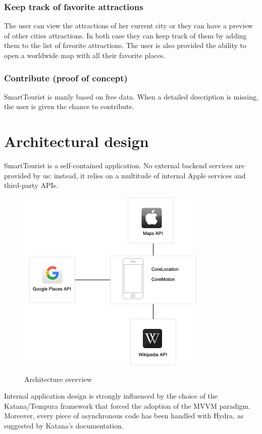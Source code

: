 \documentclass[a4paper, 11pt, parskip=half]{scrreprt}
\theoremstyle{definition}
\begin{document}
\subsection{Keep track of favorite attractions}
The user can view the attractions of her current city or they can have a preview of other cities attractions. In both case they can keep track of them by adding them to the list of favorite attractions. The user is also provided the ability to open a worldwide map with all their favorite places.

\subsection{Contribute (proof of concept)}
SmartTourist is manly based on free data. When a detailed description is missing, the user is given the chance to contribute.




\chapter{Architectural design}

SmartTourist is a self-contained application. No external backend services are provided by us: instead, it relies on a multitude of internal Apple services and third-party APIs.

\begin{figure}[H]
  	\centering
  	\includegraphics[width=0.5\linewidth]{ArchitectureOverview}
  	\label{fig:test1}
	\caption{Architecture overview}
\end{figure}

Internal application design is strongly influenced by the choice of the Katana/Tempura framework that forced the adoption of the MVVM paradigm. Moreover, every piece of asynchronous code has been handled with Hydra, as suggested by Katana's documentation.
\end{document}

